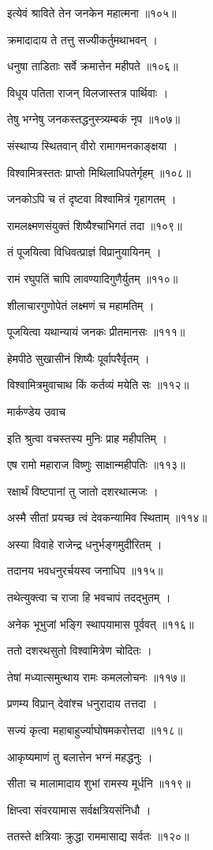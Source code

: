 इत्येवं श्राविते तेन जनकेन महात्मना ॥१०५॥

क्रमादादाय ते तत्तु सज्यीकर्तुमथाभवन् ।

धनुषा ताडिताः सर्वे क्रमात्तेन महीपते ॥१०६॥

विधूय पतिता राजन् विलजास्तत्र पार्थिवाः ।

तेषु भग्नेषु जनकस्तद्धनुस्त्र्यम्बकं नृप ॥१०७॥

संस्थाप्य स्थितवान् वीरो रामागमनकाङ्क्षया ।

विश्वामित्रस्ततः प्राप्तो मिथिलाधिपतेर्गृहम् ॥१०८॥

जनकोऽपि च तं दृष्टवा विश्वामित्रं गृहागतम् ।

रामलक्ष्मणसंयुक्तं शिष्यैश्चाभिगतं तदा ॥१०९॥

तं पूजयित्वा विधिवत्प्राज्ञं विप्रानुयायिनम् ।

रामं रघुपतिं चापि लावण्यादिगुणैर्युतम् ॥११०॥

शीलाचारगुणोपेतं लक्ष्मणं च महामतिम् ।

पूजयित्वा यथान्यायं जनकः प्रीतमानसः ॥१११॥

हेमपीठे सुखासीनं शिष्यैः पूर्वापरैर्वृतम् ।

विश्वामित्रमुवाचाथ किं कर्तव्यं मयेति सः ॥११२॥

मार्कण्डेय उवाच

इति श्रुत्वा वचस्तस्य मुनिः प्राह महीपतिम् ।

एष रामो महाराज विष्णुः साक्षान्महीपतिः ॥११३॥

रक्षार्थं विष्टपानां तु जातो दशरथात्मजः ।

अस्मै सीतां प्रयच्छ त्वं देवकन्यामिव स्थिताम् ॥११४॥

अस्या विवाहे राजेन्द्र धनुर्भङ्गमुदीरितम् ।

तदानय भवधनुरर्चयस्व जनाधिप ॥११५॥

तथेत्युक्त्वा च राजा हि भवचापं तदद्भुतम् ।

अनेक भूभुजां भङ्गि स्थापयामास पूर्ववत् ॥११६॥

ततो दशरथसुतो विश्वामित्रेण चोदितः ।

तेषां मध्यात्समुत्थाय रामः कमललोचनः ॥११७॥

प्रणम्य विप्रान् देवांश्च धनुरादाय तत्तदा ।

सज्यं कृत्वा महाबाहुर्ज्याघोषमकरोत्तदा ॥११८॥

आकृष्यमाणं तु बलात्तेन भग्नं महद्धनुः ।

सीता च मालामादाय शुभां रामस्य मूर्धनि ॥११९॥

क्षिप्त्वा संवरयामास सर्वक्षत्रियसंनिधौ ।

ततस्ते क्षत्रियाः क्रुद्धा राममासाद्य सर्वतः ॥१२०॥

